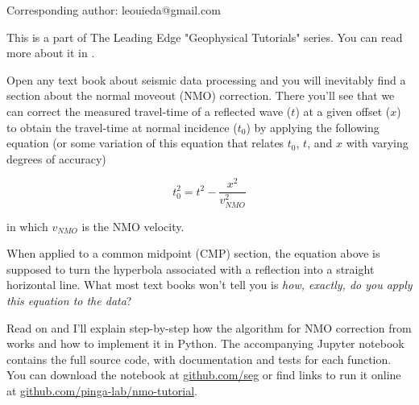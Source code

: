 Corresponding author: leouieda@gmail.com

This is a part of The Leading Edge "Geophysical Tutorials" series.
You can read more about it in \citet{Hall_2016a}.

Open any text book about seismic data processing and you will inevitably find a
section about the normal moveout (NMO) correction.
There you'll see that we can correct the measured travel-time of a reflected
wave ($t$) at a given offset ($x$) to obtain the travel-time at normal
incidence ($t_0$) by applying the following equation 
(or some variation of this equation that relates $t_0$, $t$, and $x$ with varying degrees of accuracy)

\begin{equation}
t_0^2=t^2-\dfrac{x^2}{v_{NMO}^2}
\label{eq:traveltime}
\end{equation}

in which $v_{NMO}$ is the NMO velocity.

When applied to a common midpoint (CMP) section, the equation above is
supposed to turn the hyperbola associated with a reflection into a straight
horizontal line.
What most text books won't tell you is \textit{how, exactly, do you apply this
equation to the data}?

Read on and I'll explain step-by-step how the algorithm for NMO correction from
\citet{Yilmaz_2001} works and how to implement it in Python.
The accompanying Jupyter notebook \citep{Perez_2007} contains the full source
code, with documentation and tests for each function.
You can download the notebook at
\href{https://github.com/seg}{github.com/seg} or
find links to run it online at
\href{https://github.com/pinga-lab/nmo-tutorial}{github.com/pinga-lab/nmo-tutorial}.
